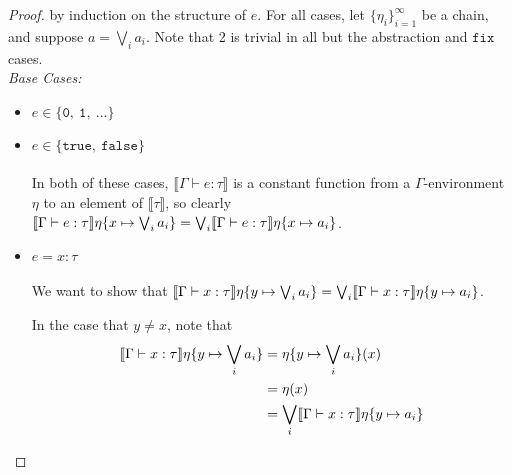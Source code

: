 \begin{proof}
by induction on the structure of $e$. For all cases, let $\{ \eta_i \}^{\infty}_{i=1}$ be a chain, and suppose $ a = \bigvee_i a_i$. 
Note that 2 is trivial in all but the abstraction and $\texttt{fix}$ cases.\\
 \emph{Base Cases: } 
 \begin{itemize}
 \item $e \in \{ \texttt{0}, \ \texttt{1}, \ \ldots \}$
 \item $e \in \{ \texttt{true}, \ \texttt{false} \}$\\ \\
  In both of these cases, $\llbracket \Gamma \vdash e : \tau \rrbracket$ is a constant function from a $\Gamma$-environment
 $\eta$ to an element of $\llbracket \tau \rrbracket$, so clearly $\llbracket{{\Gamma}\vdash{e}:{\tau}}\rrbracket{\eta\{{x}\mapsto{\bigvee_i a_i}\}} =
\bigvee_i\llbracket{{\Gamma}\vdash{e}:{\tau}}\rrbracket{\eta\{{x}\mapsto{a_i}\}}$.

 \item $e = x : \tau$ \\ \\
 We want to show that $\llbracket{{\Gamma}\vdash{x}:{\tau}}\rrbracket{\eta\{{y}\mapsto{\bigvee_i a_i}\}} =
\bigvee_i\llbracket{{\Gamma}\vdash{x}:{\tau}}\rrbracket{\eta\{{y}\mapsto{a_i}\}}$.

In the case that $ y \neq x$, note that
\begin{align*}
\llbracket{{\Gamma}\vdash{x}:{\tau}}\rrbracket{\eta\{{y}\mapsto{\bigvee_i a_i}\}} &= \eta\{y\mapsto \bigvee_i a_i\}(x) \\
&= \eta (x) \\
&= \bigvee_i\llbracket{{\Gamma}\vdash{x}:{\tau}}\rrbracket{\eta\{{y}\mapsto{a_i}\}}
\end{align*}


\end{itemize}
\end{proof}
